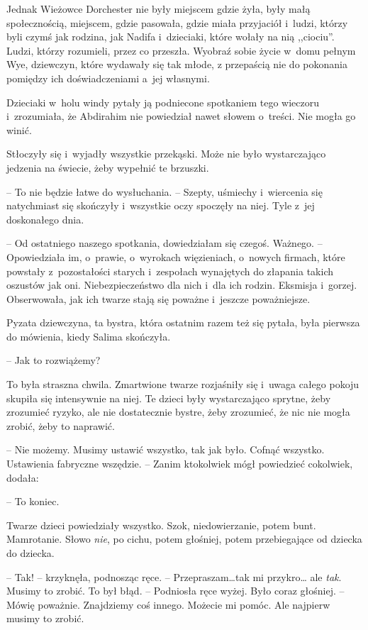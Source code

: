\documentclass[oneside,polish,11pt,sfheadings]{mwbk}
\begin{document}
Jednak Wieżowce Dorchester nie były miejscem gdzie żyła, były małą
społecznością, miejscem, gdzie pasowała, gdzie miała przyjaciół i~ludzi,
którzy byli czymś jak rodzina, jak Nadifa i~dzieciaki, które wołały na
nią ,,ciociu''. Ludzi, którzy rozumieli, przez co przeszła. Wyobraź
sobie życie w~domu pełnym Wye, dziewczyn, które wydawały się tak młode,
z przepaścią nie do pokonania pomiędzy ich doświadczeniami a~jej
własnymi.

Dzieciaki w~holu windy pytały ją podniecone spotkaniem tego wieczoru i~zrozumiała, że Abdirahim nie powiedział nawet słowem o~treści. Nie mogła
go winić.

Stłoczyły się i~wyjadły wszystkie przekąski. Może nie było wystarczająco
jedzenia na świecie, żeby wypełnić te brzuszki.

-- To nie będzie łatwe do wysłuchania. -- Szepty, uśmiechy i~wiercenia się
natychmiast się skończyły i~wszystkie oczy spoczęły na niej. Tyle z~jej
doskonałego dnia.

-- Od ostatniego naszego spotkania, dowiedziałam się czegoś. Ważnego. -- Opowiedziała im, o~prawie, o~wyrokach więzieniach, o~nowych firmach,
które powstały z~pozostałości starych i~zespołach wynajętych do złapania
takich oszustów jak oni. Niebezpieczeństwo dla nich i~dla ich rodzin.
Eksmisja i~gorzej. Obserwowała, jak ich twarze stają się poważne i~jeszcze poważniejsze.

Pyzata dziewczyna, ta bystra, która ostatnim razem też się pytała, była
pierwsza do mówienia, kiedy Salima skończyła. 

-- Jak to rozwiążemy?

To była straszna chwila. Zmartwione twarze rozjaśniły się i~uwaga całego
pokoju skupiła się intensywnie na niej. Te dzieci były wystarczająco
sprytne, żeby zrozumieć ryzyko, ale nie dostatecznie bystre, żeby
zrozumieć, że nic nie mogła zrobić, żeby to naprawić.

-- Nie możemy. Musimy ustawić wszystko, tak jak było. Cofnąć wszystko.
Ustawienia fabryczne wszędzie. -- Zanim ktokolwiek mógł powiedzieć
cokolwiek, dodała: 

-- To koniec.

Twarze dzieci powiedziały wszystko. Szok, niedowierzanie, potem bunt.
Mamrotanie. Słowo \textit{nie}, po cichu, potem głośniej, potem
przebiegające od dziecka do dziecka.

-- Tak! -- krzyknęła, podnosząc ręce. -- Przepraszam\ldots  tak mi przykro\ldots 
ale \textit{tak}. Musimy to zrobić. To był błąd. -- Podniosła ręce wyżej.
Było coraz głośniej. -- Mówię poważnie. Znajdziemy coś innego. Możecie mi
pomóc. Ale najpierw musimy to zrobić.
\end{document}

